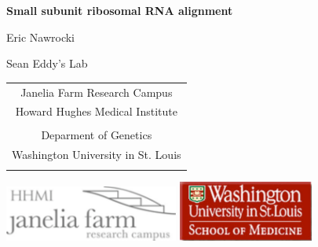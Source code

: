 \documentclass[landscape]{slides}
\begin{document}
\begin{slide}
\begin{center}
\large{\textbf{Small subunit ribosomal RNA alignment}}



\normalsize



Eric Nawrocki

Sean Eddy's Lab

\medskip

\small

\begin{tabular}{c}
Janelia Farm Research Campus \\
Howard Hughes Medical Institute \\ 
\\
Deparment of Genetics \\
Washington University in St. Louis \\
\\
\end{tabular}

\includegraphics[width=2.25in]{figs/janelia}
\hspace{2in}
\includegraphics[width=1.75in]{figs/washu}

%
%
%
%
%

\end{center}

\end{slide}
\end{document}
